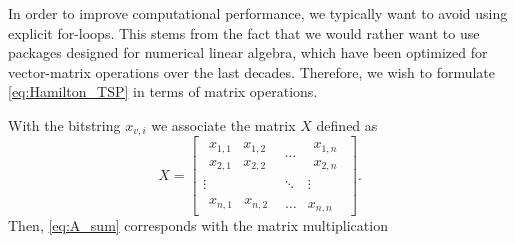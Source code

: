 In order to improve computational performance, we typically want to avoid using explicit for-loops.
This stems from the fact that we would rather want to use packages designed for numerical linear algebra, which have been optimized for vector-matrix operations over the last decades.
Therefore, we wish to formulate \eqref{eq:Hamilton_TSP} in terms of matrix operations.

With the bitstring $x_{v,i}$ we associate the matrix $X$ defined as
\begin{equation}
X = 
\begin{bmatrix}
    \begin{matrix}
        x_{1,1} & x_{1,2} \\
        x_{2,1} & x_{2,2}
    \end{matrix}
    & \cdots &
    \begin{matrix}
        x_{1,n} \\ x_{2,n}
    \end{matrix} \\
    \vdots & \ddots & \vdots \\
    \begin{matrix}
        x_{n,1} & x_{n,2}
    \end{matrix}
    & \hdots & x_{n,n}
\end{bmatrix}.
\end{equation}
Then, \eqref{eq:A_sum} corresponds with the matrix multiplication
